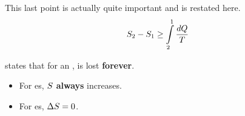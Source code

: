 This last point is actually quite important and is restated here.
\begin{equation}\label{eq:Reversible_Process_Entropy_Lost}
  S_{2} - S_{1} \geq \int\limits_{2}^{1} \frac{d Q}{T}
\end{equation}

 states that for an ,  is lost \textbf{forever}.
\begin{itemize}[noitemsep]
\item For es, $S$ \textbf{always} increases.
\item For es, $\Delta S = 0$.
\end{itemize}

